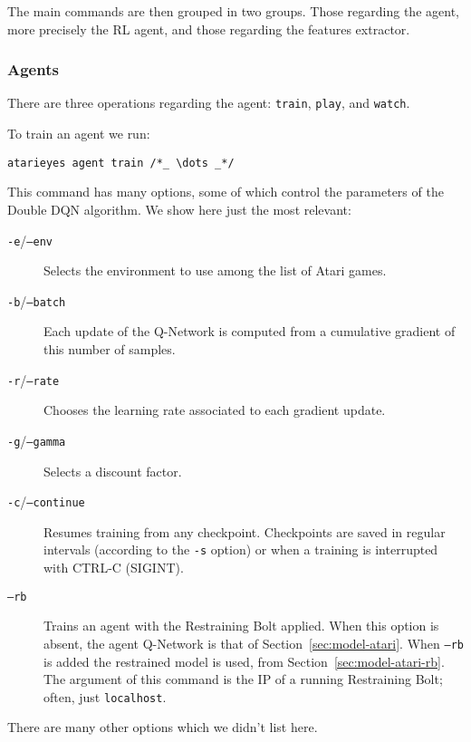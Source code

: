 The main commands are then grouped in two groups. Those regarding the agent,
more precisely the RL agent, and those regarding the features extractor.


\subsubsection*{Agents}

There are three operations regarding the agent: \texttt{train},
\texttt{play}, and \texttt{watch}.

To train an agent we run:
\begin{lstlisting}
atarieyes agent train /*_ \dots _*/
\end{lstlisting}
This command has many options, some of which control the parameters of the
Double DQN algorithm. We show here just the most relevant:
\begin{description}
	\item [\texttt{-e}/\texttt{--env}] Selects the environment to use among the
		list of Atari games.
	\item [\texttt{-b}/\texttt{--batch}] Each update of the Q-Network is
		computed from a cumulative gradient of this number of samples.
	\item [\texttt{-r}/\texttt{--rate}] Chooses the learning rate associated
		to each gradient update.
	\item [\texttt{-g}/\texttt{--gamma}] Selects a discount factor.
	\item [\texttt{-c}/\texttt{--continue}] Resumes training from any
		checkpoint. Checkpoints are saved in regular intervals (according to the
		\texttt{-s} option) or when a training is interrupted with CTRL-C
		(SIGINT).
	\item [\texttt{--rb}] Trains an agent with the Restraining Bolt applied.
		When this option is absent, the agent Q-Network is that of
		Section~\ref{sec:model-atari}. When \texttt{--rb} is added the
		restrained model is used, from Section~\ref{sec:model-atari-rb}.
		The argument of this command is the IP of a running Restraining Bolt;
		often, just \texttt{localhost}.
\end{description}
There are many other options which we didn't list here.

